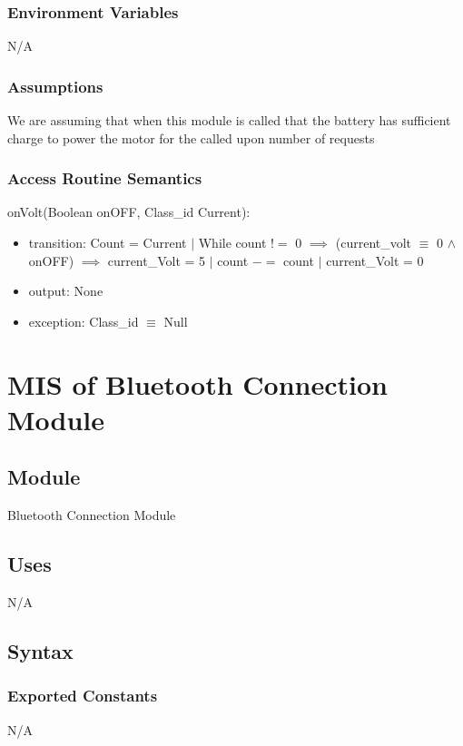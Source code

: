 \documentclass[12pt, titlepage]{article}
\begin{document}
\subsubsection{Environment Variables}

N/A

\subsubsection{Assumptions}

We are assuming that when this module is called that the battery has sufficient charge to power the motor for the called upon number of requests

\subsubsection{Access Routine Semantics}

\noindent onVolt(Boolean onOFF, Class\_id Current):
\begin{itemize}
\item transition: Count = Current $\vert$ While count $!=$ 0 $\implies$ (current\_volt $\equiv$ 0 $\land$ onOFF) $\implies$ current\_Volt = 5 $\vert$ count $-=$ count $\vert$ current\_Volt = 0  
\item output: None
\item exception: Class\_id $\equiv$ Null 
\end{itemize}

\newpage


\section{MIS of Bluetooth Connection Module} \label{Bluetooth Connection Module}
\subsection{Module}
Bluetooth Connection Module
\subsection{Uses}
N/A
\subsection{Syntax}

\subsubsection{Exported Constants}
N/A
\end{document}
